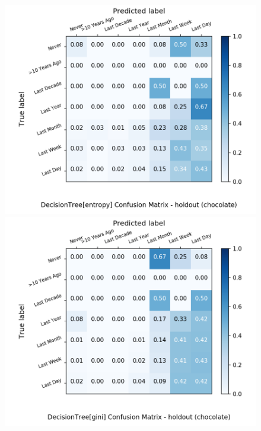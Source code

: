 \begin{figure}[H]
	\centering
	\begin{minipage}[b]{0.32\textwidth}
		\includegraphics[width=1.1\textwidth]{Plots/drugs/chocolate_DecisionTree_entropy_balance_False_holdout.png}
	\end{minipage}
	\begin{minipage}[b]{0.32\textwidth}
		\includegraphics[width=1.1\textwidth]{Plots/drugs/chocolate_DecisionTree_gini_balance_False_holdout.png}
	\end{minipage}

\end{figure}
